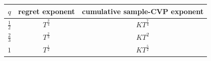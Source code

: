\begin{center}
\begin{tabular}{@{}ccc@{}}
\toprule
$q$ & regret exponent & cumulative sample-CVP exponent\\
\midrule
$\frac{1}{2}$ & $T^{\frac{3}{4}}$ & $KT^{\frac{7}{4}}$\\
$\frac{2}{3}$ & $T^{\frac{2}{3}}$ & $KT^{2}$\\
$1$ & $T^{\frac{1}{2}}$ & $KT^{\frac{5}{2}}$\\
\bottomrule
\end{tabular}
\end{center}
